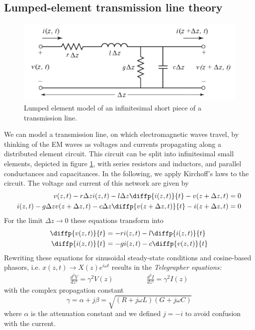 \subsection{Lumped-element transmission line theory}
\begin{figure}
	\centering
	\includegraphics[width=0.4\linewidth]{chapter-theory/figs-RF/TL_lumped}
	\caption{Lumped element model of an infinitesimal short piece of a transmission line.}
	\label{fig:tllumped}
\end{figure}
We can model a transmission line, on which electromagnetic waves travel, by thinking of the EM waves as voltages and currents propagating along a distributed element circuit.
This circuit can be split into infinitesimal small elements, depicted in figure \ref{fig:tllumped}, with series resistors and inductors, and parallel conductances and capacitances.
In the following, we apply Kirchoff's laws to the circuit.
The voltage and current of this network are given by
\begin{align}
v(z,t) - r\Delta z i(z,t) - l\Delta z \diffp{i(z,t)}{t}-v(z+\Delta z,t) &=0 \\%
i(z,t) - g\Delta z v(z+\Delta z, t) - c\Delta z \diffp{v(z+\Delta z,t)}{t} - i(z+\Delta z,t) &=0
\end{align}
For the limit $\Delta z\rightarrow0$ these equations transform into 
\begin{align}
\diffp{v(z,t)}{t} &= -ri(z,t)-l\diffp{i(z,t)}{t} \\%
\diffp{i(z,t)}{t} &= -gi(z,t)-c\diffp{v(z,t)}{t}
\end{align}
Rewriting these equations for sinusoidal steady-state conditions and cosine-based phasors, i.e. $x(z,t) \rightarrow X(z)e^{i\omega t}$ results in the \textit{Telegrapher equations:}
\begin{align}
\frac{d^2V}{dz^2} = \gamma^2V(z) \hspace{2cm} \frac{d^2I}{dz^2} = \gamma^2I(z)
\label{eq:telegraph}
\end{align}
with the complex propagation constant
\begin{equation}
\gamma = \alpha + j\beta =\sqrt{(R+j\omega L)(G+j\omega C)}
\label{eq:gamma}
\end{equation}
where $\alpha$ is the attenuation constant and we defined $j=-i$ to avoid confusion with the current.
